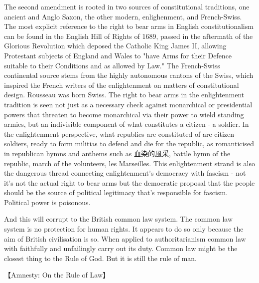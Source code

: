 The second amendment is rooted in two sources of constitutional traditions, one ancient and Anglo Saxon, the other modern, enlighenment, and French-Swiss. The most explicit reference to the right to bear arms in English constitutionalism can be found in the English Hill of Rights of 1689, passed in the aftermath of the Glorious Revolution which deposed the Catholic King James II, allowing Protestant subjects of England and Wales to 
"have Arms for their Defence suitable to their Conditions and as allowed by Law." The French-Swiss continental source stems from the highly autonomous cantons of the Swiss, which inspired the French writers of the enlightenment on matters of constitutional design. Rousseau was born Swiss. The right to bear arms in the enlightenment tradition is seen not just as a necessary check against monarchical or presidential powers that threaten to become monarchical via their power to wield standing armies, but an indivisible component of what constitutes a citizen - a soldier. In the enlightenment perspective, what republics are constituted of are citizen-soldiers, ready to form militias to defend and die for the republic, as romanticised in republican hymns and anthems such as 血染的風采,  battle hymn of the republic, march of the volunteers, les Marseilles. This enlightenment strand is also the dangerous thread connecting enlightenment’s democracy with fascism - not it’s not the actual right to bear arms but the democratic proposal that the people should be the source of political legitimacy that’s responsible for fascism. Political power is poisonous. 




And this will corrupt to the British common law system. The common law system is no protection for human rights. It appears to do so only because the aim of British civilisation is so. When applied to authoritarianism common law with faithfully and unfailingly carry out its duty. Common law might be the closest thing to the Rule of God. But it is still the rule of man. 



【Amnesty: On the Rule of Law】

